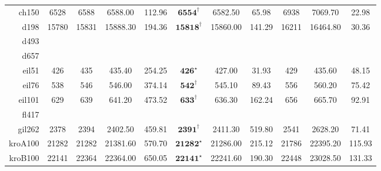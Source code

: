 \documentclass[12pt]{ctexart}
\begin{document}
\begin{table}[htbp]
\begin{tabular}{rcccccccccc}
        ch150    & 6528             & 6588                              & 6588.00                     & 112.96                                 & $\textbf{6554}^\dag$    & 6582.50          & 65.98            & 6938                  & 7069.70          & 22.98            \\
        d198     & 15780            & 15831                             & 15888.30                    & 194.36                                 & $\textbf{15818}^\dag$   & 15860.00         & 141.29           & 16211                 & 16464.80         & 30.36            \\
        d493 \\
        d657 \\
        eil51    & 426              & 435                               & 435.40                      & 254.25                                 & $\textbf{426}^\star$    & 427.00           & 31.93            & 429                   & 435.60           & 48.15            \\
        eil76    & 538              & 546                               & 546.00                      & 374.14                                 & $\textbf{542}^\dag$     & 545.10           & 89.43            & 556                   & 560.20           & 75.42            \\
        eil101   & 629              & 639                               & 641.20                      & 473.52                                 & $\textbf{633}^\dag$     & 636.30           & 162.24           & 656                   & 665.70           & 92.91            \\
        fl417 \\
        gil262   & 2378             & 2394                              & 2402.50                     & 459.81                                 & $\textbf{2391}^\dag$    & 2411.30          & 519.80           & 2541                  & 2628.20          & 71.41            \\
        kroA100  & 21282            & 21282                             & 21381.60                    & 570.70                                 & $\textbf{21282}^\star$  & 21286.00         & 215.12           & 21786                 & 22395.20         & 115.93           \\
        kroB100  & 22141            & 22364                             & 22364.00                    & 650.05                                 & $\textbf{22141}^\star$  & 22241.60         & 190.30           & 22448                 & 23028.50         & 131.33           \\

\end{tabular}
\end{table}
\end{document}
